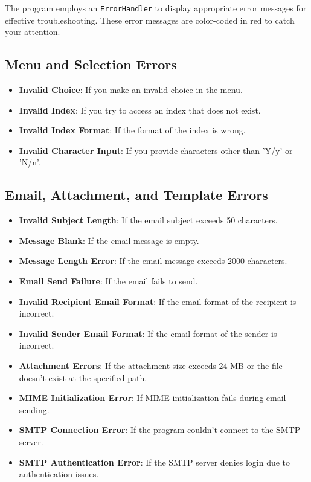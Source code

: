 \documentclass{article}
\begin{document}
	The program employs an \texttt{ErrorHandler} to display appropriate error messages for effective troubleshooting. These error messages are color-coded in red to catch your attention.
	
	\subsection{Menu and Selection Errors}
	
	\begin{itemize}
		\item \textbf{Invalid Choice}: If you make an invalid choice in the menu.
		\item \textbf{Invalid Index}: If you try to access an index that does not exist.
		\item \textbf{Invalid Index Format}: If the format of the index is wrong.
		\item \textbf{Invalid Character Input}: If you provide characters other than 'Y/y' or 'N/n'.
	\end{itemize}
	
	\subsection{Email, Attachment, and Template Errors}
	
	\begin{itemize}
		\item \textbf{Invalid Subject Length}: If the email subject exceeds 50 characters.
		\item \textbf{Message Blank}: If the email message is empty.
		\item \textbf{Message Length Error}: If the email message exceeds 2000 characters.
		\item \textbf{Email Send Failure}: If the email fails to send.
		\item \textbf{Invalid Recipient Email Format}: If the email format of the recipient is incorrect.
		\item \textbf{Invalid Sender Email Format}: If the email format of the sender is incorrect.
		\item \textbf{Attachment Errors}: If the attachment size exceeds 24 MB or the file doesn't exist at the specified path.
		\item \textbf{MIME Initialization Error}: If MIME initialization fails during email sending.
		\item \textbf{SMTP Connection Error}: If the program couldn't connect to the SMTP server.
		\item \textbf{SMTP Authentication Error}: If the SMTP server denies login due to authentication issues.
	\end{itemize}
	
\end{document}
